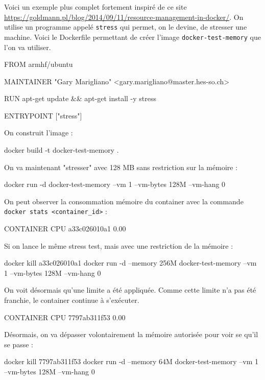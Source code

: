 \documentclass[11pt,a4paper,oneside]{report}
\newcommand{\code}[1]{\texttt{#1}}
\begin{document}
Voici un exemple plus complet fortement inspiré de ce site \url{https://goldmann.pl/blog/2014/09/11/resource-management-in-docker/}. On utilise un programme appelé \code{stress} qui permet, on le devine, de stresser une machine. Voici le Dockerfile permettant de créer l'image \code{docker-test-memory} que l'on va utiliser.

\begin{textcode}
FROM armhf/ubuntu

MAINTAINER "Gary Marigliano" <gary.marigliano@master.hes-so.ch>

RUN apt-get update && apt-get install -y stress

ENTRYPOINT ["stress"]
\end{textcode}

On construit l'image :
\begin{bashcode}
docker build -t docker-test-memory .
\end{bashcode}

On va maintenant "stresser" avec 128 MB sans restriction sur la mémoire :
\begin{textcode}
docker run -d docker-test-memory --vm 1 --vm-bytes 128M --vm-hang 0
\end{textcode}

On peut observer la consommation mémoire du container avec la commande \break \code{docker stats <container\_id>} :

\begin{bashcode}
CONTAINER           CPU %
a33c026010a1        0.00%
\end{bashcode}

Si on lance le même stress test, mais avec une restriction de la mémoire :
\begin{textcode}
docker kill a33c026010a1
docker run -d --memory 256M docker-test-memory --vm 1 --vm-bytes 128M --vm-hang 0
\end{textcode}

On voit désormais qu'une limite a été appliquée. Comme cette limite n'a pas été franchie, le container continue à s'exécuter.

\begin{textcode}
CONTAINER           CPU %
7797ab311f53        0.00%
\end{textcode}

Désormais, on va dépasser volontairement la mémoire autorisée pour voir se qu'il se passe :
\begin{textcode}
docker kill 7797ab311f53
docker run -d --memory 64M docker-test-memory --vm 1 --vm-bytes 128M --vm-hang 0
\end{textcode}
\end{document}
